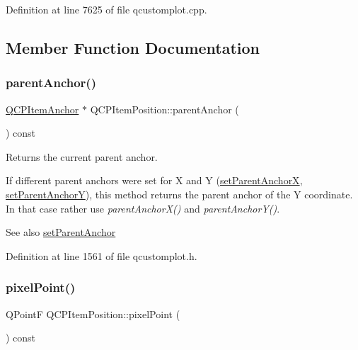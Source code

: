 Definition at line 7625 of file qcustomplot.\+cpp.



\subsection{Member Function Documentation}
\mbox{\label{class_q_c_p_item_position_a0a87f9dce1af6cc9b510785991bcf1c6}} 
\subsubsection{\texorpdfstring{parent\+Anchor()}{parentAnchor()}}
{\footnotesize\ttfamily \hyperlink{class_q_c_p_item_anchor}{Q\+C\+P\+Item\+Anchor} $\ast$ Q\+C\+P\+Item\+Position\+::parent\+Anchor (\begin{DoxyParamCaption}{ }\end{DoxyParamCaption}) const\hspace{0.3cm}{\ttfamily [inline]}}

Returns the current parent anchor.

If different parent anchors were set for X and Y (\hyperlink{class_q_c_p_item_position_add71461a973927c74e42179480916d9c}{set\+Parent\+AnchorX}, \hyperlink{class_q_c_p_item_position_add5ec1db9d19cec58a3b5c9e0a0c3f9d}{set\+Parent\+AnchorY}), this method returns the parent anchor of the Y coordinate. In that case rather use {\itshape parent\+Anchor\+X()} and {\itshape parent\+Anchor\+Y()}.

\begin{DoxySeeAlso}{See also}
\hyperlink{class_q_c_p_item_position_ac094d67a95d2dceafa0d50b9db3a7e51}{set\+Parent\+Anchor} 
\end{DoxySeeAlso}


Definition at line 1561 of file qcustomplot.\+h.

\mbox{\label{class_q_c_p_item_position_a6cad070c22801295231f5bd6045afe70}} 
\subsubsection{\texorpdfstring{pixel\+Point()}{pixelPoint()}}
{\footnotesize\ttfamily Q\+PointF Q\+C\+P\+Item\+Position\+::pixel\+Point (\begin{DoxyParamCaption}{ }\end{DoxyParamCaption}) const\hspace{0.3cm}{\ttfamily [virtual]}}

